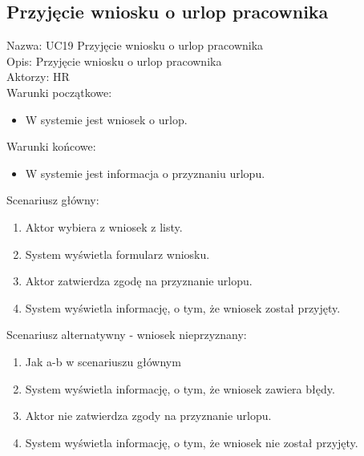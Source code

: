\subsection{Przyjęcie wniosku o urlop pracownika}
Nazwa: UC19 Przyjęcie wniosku o urlop pracownika \\
Opis: Przyjęcie wniosku o urlop pracownika \\
Aktorzy: HR \\
Warunki początkowe:
\begin{itemize}
\item W systemie jest wniosek o urlop.
\end{itemize}
Warunki końcowe:
\begin{itemize}
\item W systemie jest informacja o przyznaniu urlopu.
\end{itemize}
Scenariusz główny:
\begin{enumerate}
\item Aktor wybiera z wniosek z listy.
\item System wyświetla formularz wniosku.
\item Aktor zatwierdza zgodę na przyznanie urlopu.
\item System wyświetla informację, o tym, że wniosek został przyjęty.
\end{enumerate}
Scenariusz alternatywny - wniosek nieprzyznany: 
\begin{enumerate}
\item Jak a-b w scenariuszu głównym
\item System wyświetla informację, o tym, że wniosek zawiera błędy.
\item Aktor nie zatwierdza zgody na przyznanie urlopu.
\item System wyświetla informację, o tym, że wniosek nie został przyjęty.
\end{enumerate}

